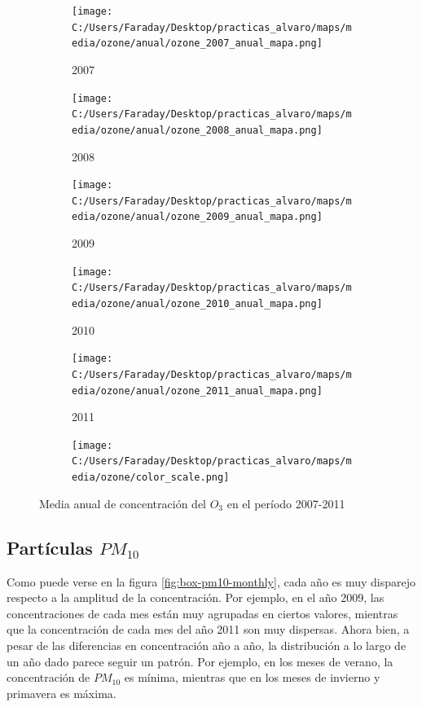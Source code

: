 \documentclass[12pt]{article}
\begin{document}
\begin{figure}[H]
\centering
\begin{subfigure}[H]{0.18\textwidth}
\texttt{[image: C:/Users/Faraday/Desktop/practicas\_alvaro/maps/media/ozone/anual/ozone\_2007\_anual\_mapa.png]}
\captionsetup{labelformat=empty}
\caption{2007}
\end{subfigure}
%
\begin{subfigure}[H]{0.18\textwidth}
\texttt{[image: C:/Users/Faraday/Desktop/practicas\_alvaro/maps/media/ozone/anual/ozone\_2008\_anual\_mapa.png]}
\captionsetup{labelformat=empty}
\caption{2008}
\end{subfigure}
%
\begin{subfigure}[H]{0.18\textwidth}
\texttt{[image: C:/Users/Faraday/Desktop/practicas\_alvaro/maps/media/ozone/anual/ozone\_2009\_anual\_mapa.png]}
\captionsetup{labelformat=empty}
\caption{2009}
\end{subfigure}
%
\begin{subfigure}[H]{0.18\textwidth}
\texttt{[image: C:/Users/Faraday/Desktop/practicas\_alvaro/maps/media/ozone/anual/ozone\_2010\_anual\_mapa.png]}
\captionsetup{labelformat=empty}
\caption{2010}
\end{subfigure}
%
\begin{subfigure}[H]{0.18\textwidth}
\texttt{[image: C:/Users/Faraday/Desktop/practicas\_alvaro/maps/media/ozone/anual/ozone\_2011\_anual\_mapa.png]}
\captionsetup{labelformat=empty}
\caption{2011}
\end{subfigure}

\begin{subfigure}[H]{0.45\textwidth}
\texttt{[image: C:/Users/Faraday/Desktop/practicas\_alvaro/maps/media/ozone/color\_scale.png]}
\captionsetup{labelformat=empty}
\caption{}
\end{subfigure}

\vspace*{-7mm}
\caption{Media anual de concentración del $O_{3}$ en el período 2007-2011}
\label{fig:map-ozone-anual}
\end{figure}

\subsection*{Partículas \textbf{\texorpdfstring{$PM_{10}$}{PM10}}}
%

Como puede verse en la figura \ref{fig:box-pm10-monthly}, cada año es muy disparejo respecto a la amplitud de la concentración. Por ejemplo, en el año 2009, las concentraciones de cada mes están muy agrupadas en ciertos valores, mientras que la concentración de cada mes del año 2011 son muy dispersas. Ahora bien, a pesar de las diferencias en concentración año a año, la distribución a lo largo de un año dado parece seguir un patrón. Por ejemplo, en los meses de verano, la concentración de $PM_{10}$ es mínima, mientras que en los meses de invierno y primavera es máxima.
\end{document}
